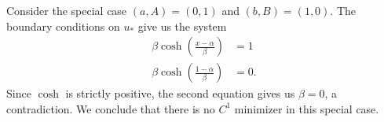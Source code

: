 \documentclass[11pt]{article}
\begin{document}
\begin{enumerate}
Consider the special case $(a,A) = (0, 1)$ and $(b, B) = (1,0)$. The boundary conditions on $u_*$ give us the system
\begin{align*}
\beta \cosh \left( \frac{x - \alpha}{\beta} \right) &= 1 \\
\beta \cosh\left( \frac{1 - \alpha}{\beta} \right) &= 0.
\end{align*}
Since $\cosh$ is strictly positive, the second equation gives us $\beta = 0$, a contradiction. We conclude that there is no $C^1$ minimizer in this special case.
\end{enumerate}
\end{document}
